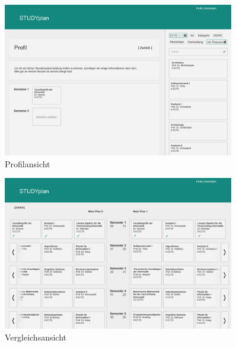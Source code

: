 \begin{figure}
	\caption{Profilansicht}
	\label{fig:gui-profil-1}
	\centering
	\includegraphics[width=0.9\textwidth]{../GUI/ergebnisse/profil-1.png}
\end{figure}
\begin{figure}
	\caption{Vergleichsansicht}
	\label{fig:gui-vergleich-1}
	\centering
	\includegraphics[width=0.9\textwidth]{../GUI/ergebnisse/vergleich-1.png}
\end{figure}
\FloatBarrier